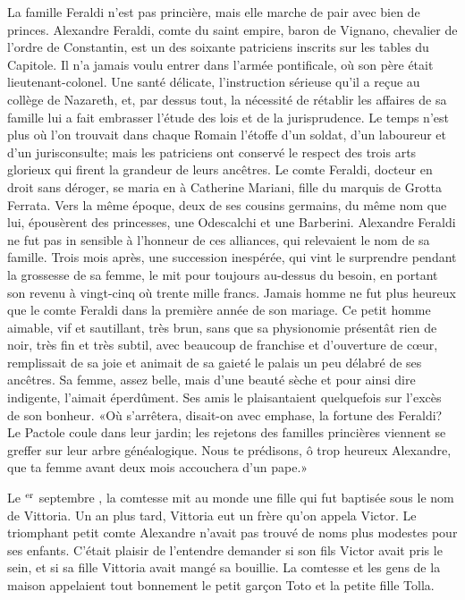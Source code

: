 
La famille Feraldi n’est pas princière, mais elle marche de pair avec bien de princes. Alexandre Feraldi, comte du saint empire, baron de Vignano, chevalier de l’ordre de Constantin, est un des soixante patriciens inscrits sur les tables du Capitole. Il n’a jamais voulu entrer dans l’armée pontificale, où son père était lieutenant-colonel. Une santé délicate, l’instruction sérieuse qu’il a reçue au collège de Nazareth, et, par dessus tout, la nécessité de rétablir les affaires de sa famille lui a fait embrasser l’étude des lois et de la jurisprudence. Le temps n’est plus où l’on trouvait dans chaque Romain l’étoffe d’un soldat, d’un laboureur et d’un jurisconsulte; mais les patriciens ont conservé le respect des trois arts glorieux qui firent la grandeur de leurs ancêtres. Le comte Feraldi, docteur en droit sans déroger, se maria en  à Catherine Mariani, fille du marquis de Grotta Ferrata. Vers la même époque, deux de ses cousins germains, du même nom que lui, épousèrent des princesses, une Odescalchi et une Barberini. Alexandre Feraldi ne fut pas in sensible à l’honneur de ces alliances, qui relevaient le nom de sa famille. Trois mois après, une succession inespérée, qui vint le surprendre pendant la grossesse de sa femme, le mit pour toujours au-dessus du besoin, en portant son revenu à vingt-cinq où trente mille francs. Jamais homme ne fut plus heureux que le comte Feraldi dans la première année de son mariage. Ce petit homme aimable, vif et sautillant, très brun, sans que sa physionomie présentât rien de noir, très fin et très subtil, avec beaucoup de franchise et d’ouverture de cœur, remplissait de sa joie et animait de sa gaieté le palais un peu délabré de ses ancêtres. Sa femme, assez belle, mais d’une beauté sèche et pour ainsi dire indigente, l’aimait éperdûment. Ses amis le plaisantaient quelquefois sur l’excès de son bonheur. «Où s’arrêtera, disait-on avec emphase, la fortune des Feraldi? Le Pactole coule dans leur jardin; les rejetons des familles princières viennent se greffer sur leur arbre généalogique. Nous te prédisons, ô trop heureux Alexandre, que ta femme avant deux mois accouchera d’un pape.»

Le $\textsuperscript{er}$ septembre , la comtesse mit au monde une fille qui fut baptisée sous le nom de Vittoria. Un an plus tard, Vittoria eut un frère qu’on appela Victor. Le triomphant petit comte Alexandre n’avait pas trouvé de noms plus modestes pour ses enfants. C’était plaisir de l’entendre demander si son fils Victor avait pris le sein, et si sa fille Vittoria avait mangé sa bouillie. La comtesse et les gens de la maison appelaient tout bonnement le petit garçon Toto et la petite fille Tolla.

